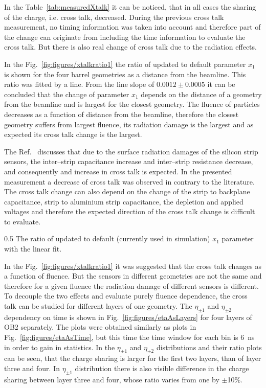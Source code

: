 In the Table~\ref{tab:measuredXtalk} it can be noticed, that in all cases the sharing of the charge, i.e. cross talk, decreased. During the previous cross talk measurement, no timing information was taken into account and therefore part of the change can originate from including the time information to evaluate the cross talk. But there is also real change of cross talk due to the radiation effects. 

In the Fig.~\ref{fig:figures/xtalkratio1} the ratio of updated to default parameter $x_{1}$ is shown for the four barrel geometries as a distance from the beamline. This ratio was fitted by a line. From the line slope of $0.0012 \pm 0.0005$ it can be concluded that the change of parameter $x_{1}$ depends on the distance of a geometry from the beamline and is largest for the closest geometry. The fluence of particles decreases as a function of distance from the beamline, therefore the closest geometry suffers from largest fluence, its radiation damage is the largest and as expected its cross talk change is the largest.  

The Ref.~\cite{Hartmann:2017gzy} discusses that due to the surface radiation damages of the silicon strip sensors, the inter--strip capacitance increase and inter--strip resistance decrease, and consequently and increase in cross talk is expected. In the presented measurement a decrease of cross talk was observed in contrary to the literature. The cross talk change can also depend on the change of the strip to backplane capacitance, strip to aluminium strip capacitance, the depletion and applied voltages and therefore the expected direction of the cross talk change is difficult to evaluate.

                 {0.5}       %
                 {The ratio of updated to default (currently used in simulation) $x_{1}$ parameter with the linear fit.}


In the Fig.~\ref{fig:figures/xtalkratio1} it was suggested that the cross talk changes as a function of fluence. But the sensors in different geometries are not the same and therefore for a given fluence the radiation damage of different sensors is different. To decouple the two effects and evaluate purely fluence dependence, the cross talk can be studied for different layers of one geometry. The $\eta_{\pm 1}$ and $\eta_{\pm 2}$ dependency on time is shown in Fig.~\ref{fig:figures/etaAsLayers} for four layers of OB2 separately. The plots were obtained similarly as plots in Fig.~\ref{fig:figures/etaAsTime}, but this time the time window for each bin is 6~ns in order to gain in statistics. In the $\eta_{\pm 1}$ and $\eta_{\pm 2}$ distributions and their ratio plots can be seen, that the charge sharing is larger for the first two layers, than of layer three and four. In  $\eta_{\pm 1}$ distribution there is also visible difference in the charge sharing between layer three and four, whose ratio varies from one by $\pm$10\%. 

